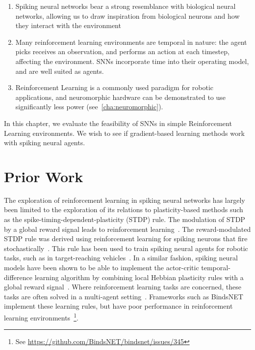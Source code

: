 \documentclass[fyp]{socreport}
\begin{document}
\begin{enumerate}
  \item Spiking neural networks bear a strong resemblance with biological neural
    networks, allowing us to draw inspiration from biological neurons and how
    they interact with the environment
  \item Many reinforcement learning environments are temporal in nature: the
    agent picks receives an observation, and performs an action at each
    timestep, affecting the environment. SNNs incorporate time into their
    operating model, and are well suited as agents.
  \item Reinforcement Learning is a commonly used paradigm for robotic
    applications, and neuromorphic hardware can be demonstrated to use
    significantly less power (see~\autoref{cha:neuromorphic}).
\end{enumerate}

In this chapter, we evaluate the feasibility of SNNs in simple Reinforcement
Learning environments. We wish to see if gradient-based learning methods work
with spiking neural agents.

\section{Prior Work}

The exploration of reinforcement learning in spiking neural networks has largely
been limited to the exploration of its relations to plasticity-based methods
such as the spike-timing-dependent-plasticity (STDP) rule. The modulation of
STDP by a global reward signal leads to reinforcement
learning~\cite{florian07_reinf_learn_throug_modul_spike,baras07_reinf_learn_spike_time_depen}.
The reward-modulated STDP rule was derived using reinforcement learning for
spiking neurons that fire stochastically~\cite{florian2005}. This rule has been
used to train spiking neural agents for robotic tasks, such as in
target-reaching vehicles~\cite{10.3389/fnbot.2019.00018}. In a similar fashion,
spiking neural models have been shown to be able to implement the actor-critic
temporal-difference learning algorithm by combining local Hebbian plasticity
rules with a global reward
signal~\cite{potjans09_spikin_neural_networ_model_actor}. Where reinforcement
learning tasks are concerned, these tasks are often solved in a multi-agent
setting~\cite{VITANZA20153122,aenugu19_reinf_learn_with_spikin_coagen}.
Frameworks such as BindsNET~\cite{10.3389/fninf.2018.00089} implement these
learning rules, but have poor performance in reinforcement learning
environments~\footnote{See
  \url{https://github.com/BindsNET/bindsnet/issues/345}}.
\end{document}

